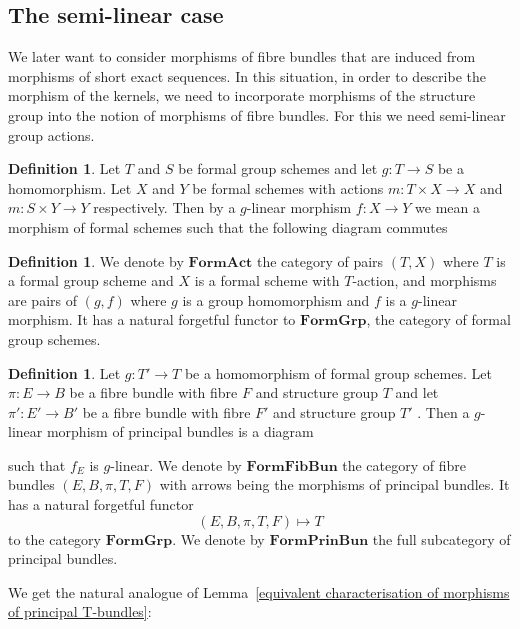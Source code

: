 \documentclass[10pt,oneside]{amsart}
\theoremstyle{definition}
\newtheorem{definition}[theorem]{Definition}
\theoremstyle{remark}
\begin{document}
	\subsection{The semi-linear case}
	We later want to consider morphisms of fibre bundles that are induced from morphisms of short exact sequences. In this situation, in order to describe the morphism of the kernels, we need to incorporate morphisms of the structure group into the notion of morphisms of fibre bundles. For this we need semi-linear group actions.
	\begin{definition}
		Let $T$ and $S$ be formal group schemes and let $g:T\rightarrow S$ be a homomorphism. Let $X$ and $Y$ be formal schemes with actions $m:T\times X\rightarrow X$ and $m:S\times Y\rightarrow Y$ respectively. Then by a $g$-linear morphism $f:X\rightarrow Y$ we mean a morphism of formal schemes such that the following diagram commutes
		\begin{center}
		\end{center}
	\end{definition}
	
	\begin{definition}
		We denote by $\mathbf{FormAct}$ the category of pairs $(T,X)$ where $T$ is a formal group scheme and $X$ is a formal scheme with $T$-action, and morphisms are pairs of $(g,f)$ where $g$ is a group homomorphism and $f$ is a $g$-linear morphism. It has a natural forgetful functor to $
		\mathbf{FormGrp}$, the category of formal group schemes.
	\end{definition}
	
	\begin{definition}
		Let $g:T'\rightarrow T$ be a homomorphism of formal group schemes. Let $\pi:E\rightarrow B$ be a fibre bundle with fibre $F$ and structure group $T$ and let $\pi':E'\rightarrow B'$ be a fibre bundle with fibre $F'$ and structure group $T'$ . Then a $g$-linear morphism of principal bundles is a diagram
		\begin{center}
		\end{center}		
		such that $f_E$ is $g$-linear. We denote by $\mathbf{ FormFibBun}$ the category of fibre bundles $(E,B,\pi,T,F)$ with arrows being the morphisms of principal bundles. It has a natural forgetful functor \[(E,B,\pi,T,F) \mapsto T\]
		to the category $\mathbf{FormGrp}$. We denote by $\mathbf{FormPrinBun}$ the full subcategory of principal bundles.
	\end{definition}
	We get the natural analogue of Lemma~\ref{equivalent characterisation of morphisms of principal T-bundles}:
	
\end{document}
